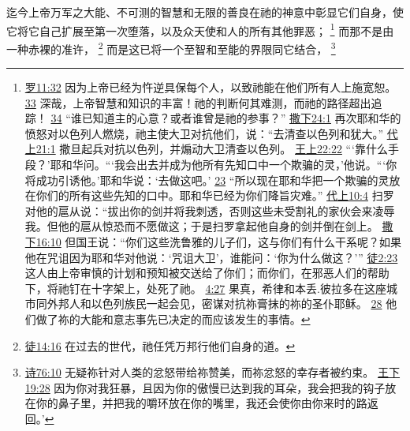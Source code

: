 \documentclass[12pt, a4paper, oneside]{ctexart}
\newcounter{parnum}[section]
\newcommand{\N}{%
   \noindent\refstepcounter{parnum}%
    \makebox[\parindent][l]{\textbf{\arabic{parnum}.}}}
\begin{document}
\N 迄今上帝万军之大能、不可测的智慧和无限的善良在祂的神意中彰显它们自身，使它将它自己扩展至第一次堕落，以及众天使和人的所有其他罪恶；
	\footnote {
		\href{https://biblehub.com/romans/11-32.htm}{罗11:32} 因为上帝已经为忤逆具保每个人，以致祂能在他们所有人上施宽恕。
		\href{https://biblehub.com/romans/11-33.htm}{33} 深哉，上帝智慧和知识的丰富！祂的判断何其难测，而祂的路径超出追踪！
		\href{https://biblehub.com/romans/11-34.htm}{34} “谁已知道主的心意？或者谁曾是祂的参事？”
		\href{https://biblehub.com/2_samuel/24-1.htm}{撒下24:1} 再次耶和华的愤怒对以色列人燃烧，祂主使大卫对抗他们，说：“去清查以色列和犹大。”
		\href{https://biblehub.com/1_chronicles/21-1.htm}{代上21:1} 撒旦起兵对抗以色列，并煽动大卫清查以色列。
		\href{https://biblehub.com/1_kings/22-22.htm}{王上22:22} “‘靠什么手段？’耶和华问。“‘我会出去并成为他所有先知口中一个欺骗的灵，’他说。“‘你将成功引诱他。’耶和华说：‘去做这吧。’
		\href{https://biblehub.com/1_kings/22-23.htm}{23} “所以现在耶和华把一个欺骗的灵放在你们的所有这些先知的口中。耶和华已经为你们降旨灾难。”
		\href{https://biblehub.com/1_chronicles/10-4.htm}{代上10:4} 扫罗对他的扈从说：“拔出你的剑并将我刺透，否则这些未受割礼的家伙会来凌辱我。但他的扈从惊恐而不愿做这；于是扫罗拿起他自身的剑并倒在剑上。
		\href{https://biblehub.com/2_samuel/16-10.htm}{撒下16:10} 但国王说：“你们这些洗鲁雅的儿子们，这与你们有什么干系呢？如果他在咒诅因为耶和华对他说：‘咒诅大卫’，谁能问：‘你为什么做这？’”
		\href{https://biblehub.com/acts/2-23.htm}{徒2:23} 这人由上帝审慎的计划和预知被交送给了你们；而你们，在邪恶人们的帮助下，将祂钉在十字架上，处死了祂。
		\href{https://biblehub.com/acts/4-27.htm}{4:27} 果真，希律和本丢.彼拉多在这座城市同外邦人和以色列族民一起会见，密谋对抗祢膏抹的祢的圣仆耶稣。
		\href{https://biblehub.com/acts/4-28.htm}{28} 他们做了祢的大能和意志事先已决定的而应该发生的事情。
	}
	而那不是由一种赤裸的准许，
	\footnote {
		\href{https://biblehub.com/acts/14-16.htm}{徒14:16} 在过去的世代，祂任凭万邦行他们自身的道。
	}
	而是这已将一个至智和至能的界限同它结合，
	\footnote {
		\href{https://biblehub.com/psalms/76-10.htm}{诗76:10} 无疑祢针对人类的忿怒带给祢赞美，而祢忿怒的幸存者被约束。
		\href{https://biblehub.com/2_kings/19-28.htm}{王下19:28} 因为你对我狂暴，且因为你的傲慢已达到我的耳朵，我会把我的钩子放在你的鼻子里，并把我的嚼环放在你的嘴里，我还会使你由你来时的路返回。’
	}
\end{document}
